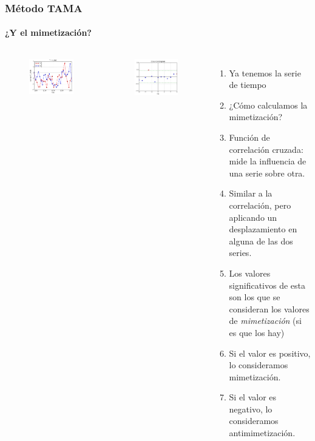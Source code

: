 \begin{frame}
  \frametitle{Método TAMA}
  \framesubtitle{¿Y el mimetización?}
  \begin{columns}
  \begin{figure}[t]
    \includegraphics[scale=0.28]{images/time_plot.png}
  \end{figure}
  \begin{figure}[t]
    \includegraphics[scale=0.28]{images/cross_correlogram.png}
  \end{figure}
  \begin{enumerate}
    \item Ya tenemos la serie de tiempo
    \item ¿Cómo calculamos la mimetización?
    \item Función de correlación cruzada: mide la influencia de una serie sobre otra.
    \item Similar a la correlación, pero aplicando un desplazamiento en alguna de las dos series.
    \item Los valores significativos de esta son los que se consideran los valores de \emph{mimetización} (si es que los hay)
    \item Si el valor es positivo, lo consideramos mimetización.
    \item Si el valor es negativo, lo consideramos antimimetización.
  \end{enumerate}

  \end{columns}
\end{frame}
